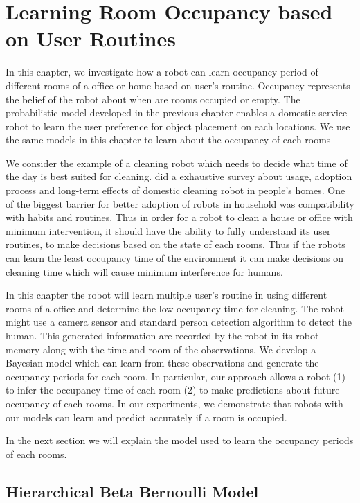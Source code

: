\chapter{Learning Room Occupancy based on User Routines}

In this chapter, we investigate how a robot can learn occupancy period of different rooms of a office or home based on user's routine. Occupancy represents the belief of the robot about when are rooms occupied or empty. The probabilistic model developed in the previous chapter enables a domestic service robot to learn the user preference for object placement on each locations. We use the same models in this chapter to learn about the occupancy of each rooms

We consider the example of a cleaning robot which needs to decide what time of the day is best suited for cleaning. \cite{Fink2013} did a exhaustive survey about usage, adoption process and long-term effects of domestic cleaning robot in people's homes. One of the biggest barrier for better adoption of robots in household was compatibility with habits and routines. Thus in order for a robot to clean a house or office with minimum intervention, it should have the ability to fully understand its user routines, to make decisions based on the state of each rooms. Thus if the robots can learn the  least occupancy time of the environment it can make decisions on cleaning time which will cause minimum interference for humans. 


In this chapter the robot will learn multiple user's routine in using different rooms of a office and determine the low occupancy time for cleaning.
The robot might use a camera sensor and standard person detection algorithm to detect the human. This generated information are recorded by the robot in its robot memory along with the time and room of the observations. We develop a Bayesian model which can learn from these observations and generate the occupancy periods for each room. In particular, our approach allows a robot (1) to infer the occupancy time of each room (2) to make predictions about future occupancy of each rooms. In our experiments, we demonstrate that robots with our models can learn and predict accurately if a room is occupied.

In the next section we will explain the model used to learn the occupancy periods of each rooms. 

\section{Hierarchical Beta Bernoulli Model}

